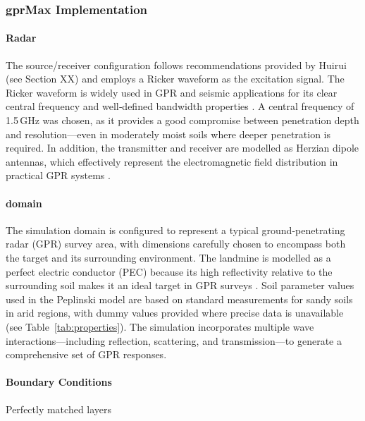     
    
    \subsubsection{gprMax Implementation}

        \paragraph{Radar}
        
             The source/receiver configuration follows recommendations provided by Huirui (see Section XX) and employs a Ricker waveform as the excitation signal. The Ricker waveform is widely used in GPR and seismic applications for its clear central frequency and well‐defined bandwidth properties \cite{dummyRef2}. A central frequency of 1.5\,GHz was chosen, as it provides a good compromise between penetration depth and resolution—even in moderately moist soils where deeper penetration is required. In addition, the transmitter and receiver are modelled as Herzian dipole antennas, which effectively represent the electromagnetic field distribution in practical GPR systems \cite{dummyRef3}.
    
        \paragraph{domain}
        
            The simulation domain is configured to represent a typical ground-penetrating radar (GPR) survey area, with dimensions carefully chosen to encompass both the target and its surrounding environment. The landmine is modelled as a perfect electric conductor (PEC) because its high reflectivity relative to the surrounding soil makes it an ideal target in GPR surveys \cite{dummyRef6}. Soil parameter values used in the Peplinski model are based on standard measurements for sandy soils in arid regions, with dummy values provided where precise data is unavailable (see Table~\ref{tab:properties}). The simulation incorporates multiple wave interactions—including reflection, scattering, and transmission—to generate a comprehensive set of GPR responses.

        \paragraph{Boundary Conditions}
            Perfectly matched layers
        
    
